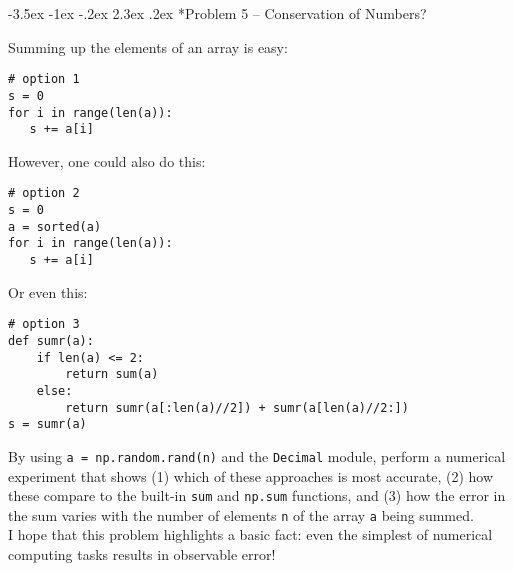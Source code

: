 \documentclass[11pt]{article}
\makeatletter
\renewcommand\section{\@startsection{section}{1}{\z@}%
                                  {-3.5ex \@plus -1ex \@minus -.2ex}%
                                  {2.3ex \@plus.2ex}%
                                  {\normalfont\bfseries}}
\makeatother
\begin{document}
\section*{Problem 5 -- Conservation of Numbers?}

Summing up the elements of an array is easy:
\begin{verbatim}
# option 1
s = 0   
for i in range(len(a)):
   s += a[i]
\end{verbatim}
However, one could also do this:
\begin{verbatim}
# option 2
s = 0   
a = sorted(a)
for i in range(len(a)):
   s += a[i]
\end{verbatim}
Or even this:
\begin{verbatim}
# option 3
def sumr(a):
    if len(a) <= 2:
        return sum(a)
    else:
        return sumr(a[:len(a)//2]) + sumr(a[len(a)//2:])
s = sumr(a)
\end{verbatim}
By using {\tt a = np.random.rand(n)} and the {\tt Decimal} module, perform a numerical experiment that shows (1) which of these approaches is most accurate, (2) how these compare to the built-in {\tt sum} and {\tt np.sum} functions, and (3) how the error in the sum varies with the number of elements {\tt n} of the array {\tt a} being summed. \\

I hope that this problem highlights a basic fact: even the simplest of numerical computing tasks results in observable error!
\end{document}
